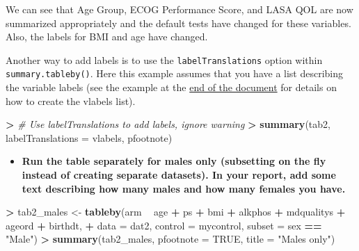 \documentclass[
]{book}
\newenvironment{Shaded}{\begin{snugshade}}{\end{snugshade}}
\newcommand{\CommentTok}[1]{\textcolor[rgb]{0.56,0.35,0.01}{\textit{#1}}}
\newcommand{\DataTypeTok}[1]{\textcolor[rgb]{0.13,0.29,0.53}{#1}}
\newcommand{\ErrorTok}[1]{\textcolor[rgb]{0.64,0.00,0.00}{\textbf{#1}}}
\newcommand{\KeywordTok}[1]{\textcolor[rgb]{0.13,0.29,0.53}{\textbf{#1}}}
\newcommand{\NormalTok}[1]{#1}
\newcommand{\OperatorTok}[1]{\textcolor[rgb]{0.81,0.36,0.00}{\textbf{#1}}}
\newcommand{\OtherTok}[1]{\textcolor[rgb]{0.56,0.35,0.01}{#1}}
\newcommand{\StringTok}[1]{\textcolor[rgb]{0.31,0.60,0.02}{#1}}
\providecommand{\tightlist}{%
  \setlength{\itemsep}{0pt}\setlength{\parskip}{0pt}}
\begin{document}
We can see that Age Group, ECOG Performance Score, and LASA QOL are now summarized appropriately and the default tests have changed for these variables. Also, the labels for BMI and age have changed.

Another way to add labels is to use the \texttt{labelTranslations} option within \texttt{summary.tableby()}. Here this example assumes that you have a list describing the variable labels (see the example at the \protect\hyperlink{vlabels}{end of the document} for details on how to create the vlabels list).

\begin{Shaded}
\begin{Highlighting}[]
\OperatorTok{>}\StringTok{ }\CommentTok{# Use labelTranslations to add labels, ignore warning}
\ErrorTok{>}\StringTok{ }\KeywordTok{summary}\NormalTok{(tab2, }\DataTypeTok{labelTranslations =}\NormalTok{ vlabels, pfootnote)}
\end{Highlighting}
\end{Shaded}

\begin{itemize}
\tightlist
\item
  \textbf{Run the table separately for males only (subsetting on the fly instead of creating separate datasets). In your report, add some text describing how many males and how many females you have.}
\end{itemize}

\begin{Shaded}
\begin{Highlighting}[]
\OperatorTok{>}\StringTok{ }\NormalTok{tab2_males <-}\StringTok{ }\KeywordTok{tableby}\NormalTok{(arm }\OperatorTok{~}\StringTok{ }\NormalTok{age }\OperatorTok{+}\StringTok{ }\NormalTok{ps }\OperatorTok{+}\StringTok{ }\NormalTok{bmi }\OperatorTok{+}\StringTok{ }\NormalTok{alkphos }\OperatorTok{+}\StringTok{ }\NormalTok{mdqualitys }\OperatorTok{+}\StringTok{ }\NormalTok{ageord }\OperatorTok{+}\StringTok{ }\NormalTok{birthdt, }
\OperatorTok{+}\StringTok{     }\DataTypeTok{data =}\NormalTok{ dat2, }\DataTypeTok{control =}\NormalTok{ mycontrol, }\DataTypeTok{subset =}\NormalTok{ sex }\OperatorTok{==}\StringTok{ "Male"}\NormalTok{)}
\OperatorTok{>}\StringTok{ }\KeywordTok{summary}\NormalTok{(tab2_males, }\DataTypeTok{pfootnote =} \OtherTok{TRUE}\NormalTok{, }\DataTypeTok{title =} \StringTok{"Males only"}\NormalTok{)}
\end{Highlighting}
\end{Shaded}
\end{document}

